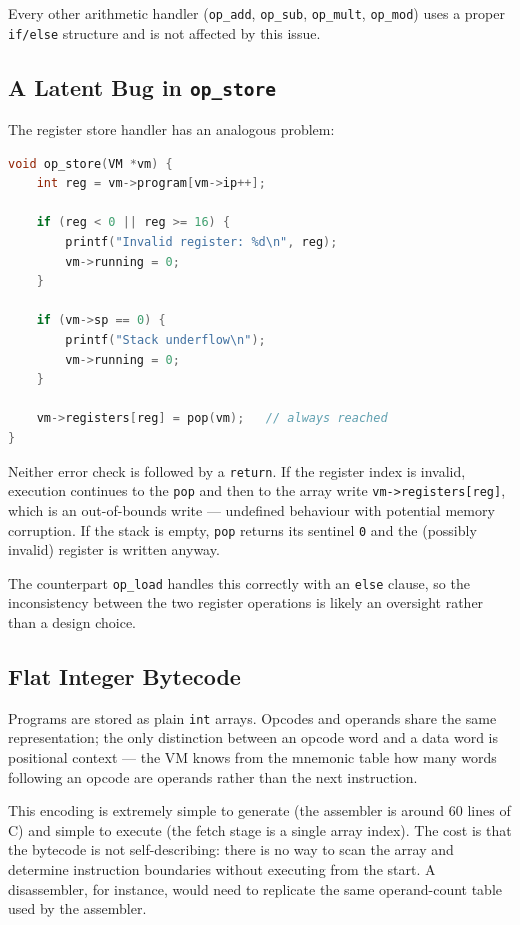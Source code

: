 Every other arithmetic handler (\texttt{op\_add}, \texttt{op\_sub}, \texttt{op\_mult}, \texttt{op\_mod}) uses a proper \texttt{if/else} structure and is not affected by this issue.

\subsection{A Latent Bug in \texttt{op\_store}}

The register store handler has an analogous problem:

\begin{lstlisting}[language=C]
void op_store(VM *vm) {
    int reg = vm->program[vm->ip++];

    if (reg < 0 || reg >= 16) {
        printf("Invalid register: %d\n", reg);
        vm->running = 0;
    }

    if (vm->sp == 0) {
        printf("Stack underflow\n");
        vm->running = 0;
    }

    vm->registers[reg] = pop(vm);   // always reached
}
\end{lstlisting}

Neither error check is followed by a \texttt{return}. If the register index is invalid, execution continues to the \texttt{pop} and then to the array write \texttt{vm->registers[reg]}, which is an out-of-bounds write — undefined behaviour with potential memory corruption. If the stack is empty, \texttt{pop} returns its sentinel \texttt{0} and the (possibly invalid) register is written anyway.

The counterpart \texttt{op\_load} handles this correctly with an \texttt{else} clause, so the inconsistency between the two register operations is likely an oversight rather than a design choice.

\subsection{Flat Integer Bytecode}

Programs are stored as plain \texttt{int} arrays. Opcodes and operands share the same representation; the only distinction between an opcode word and a data word is positional context — the VM knows from the mnemonic table how many words following an opcode are operands rather than the next instruction.

This encoding is extremely simple to generate (the assembler is around 60 lines of C) and simple to execute (the fetch stage is a single array index). The cost is that the bytecode is not self-describing: there is no way to scan the array and determine instruction boundaries without executing from the start. A disassembler, for instance, would need to replicate the same operand-count table used by the assembler.

